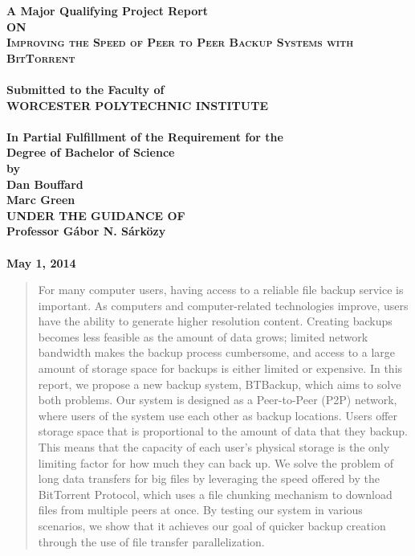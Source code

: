 \documentclass[12pt]{report}
\begin{document}
\begin{titlepage}
\begin{center}
\thispagestyle{empty}
\Large{\textbf{A Major Qualifying Project Report\\ \large{ON}}}\\[1.75cm]
\LARGE{\textsc {\textbf{Improving the Speed of Peer to Peer Backup Systems with BitTorrent}}}\\[0.5cm]
\vspace{0.25cm}
\Large{\textbf{\\Submitted to the Faculty of }}
\LARGE{\textbf{\\WORCESTER POLYTECHNIC INSTITUTE\\}}
\vspace{0.5cm}
\Large{\textbf{\\In Partial Fulfillment of the Requirement for the}}
\Large{\textbf{\\Degree of Bachelor of Science}}
\vspace{0.5cm}
\Large{\textbf{\\by}}\\[0.75cm]
\large{\textbf{Dan Bouffard}}\\
\large{\textbf{Marc Green}}\\
\vspace{0.75cm}
\large{\textbf{UNDER THE GUIDANCE OF}}\\
\large{\textbf{Professor G\'abor N. S\'ark\"ozy}}\\
\vspace{1.5cm}
\large{\textbf{\\May 1, 2014}}\\
\end{center}
\end{titlepage}

\begin{abstract}
For many computer users, having access to a reliable file backup service is important. As computers and computer-related technologies improve, users have the ability to generate higher resolution content. Creating backups becomes less feasible as the amount of data grows; limited network bandwidth makes the backup process cumbersome, and access to a large amount of storage space for backups is either limited or expensive. In this report, we propose a new backup system, BTBackup, which aims to solve both problems. Our system is designed as a Peer-to-Peer (P2P) network, where users of the system use each other as backup locations. Users offer storage space that is proportional to the amount of data that they backup. This means that the capacity of each user's physical storage is the only limiting factor for how much they can back up. We solve the problem of long data transfers for big files by leveraging the speed offered by the BitTorrent Protocol, which uses a file chunking mechanism to download files from multiple peers at once. By testing our system in various scenarios, we show that it achieves our goal of quicker backup creation through the use of file transfer parallelization.
\end{abstract}
\end{document}
